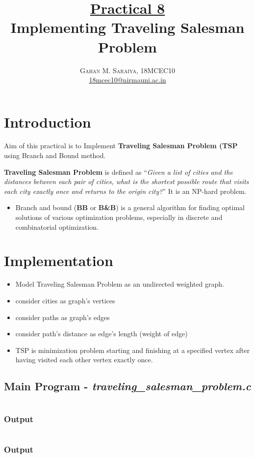 \documentclass[paper=letter, fontsize=12pt]{article}
\title{\vspace{-15mm}\fontsize{24pt}{10pt}\selectfont\textbf{
		\underline{Practical 8}\\Implementing Traveling Salesman Problem}} %
\author{\large{\textsc{
		Gahan M. Saraiya, 18MCEC10 }}\\[2mm]
\normalsize \href{mailto:18mcec10@nirmauni.ac.in}{18mcec10@nirmauni.ac.in}\\[2mm] %
}
\date{}
\begin{document}
\maketitle %
\thispagestyle{fancy} %

\section{Introduction}
\paragraph{}
Aim of this practical is to Implement \textbf{Traveling Salesman Problem (TSP} using Branch and Bound method.

\textbf{Traveling Salesman Problem} is defined as “\textit{Given a list of cities and the distances between each pair of cities, what is the shortest possible route that visits each city exactly once and returns to the origin city?}” It is an NP-hard problem.
\begin{itemize}
	\item Branch and bound (\textbf{BB} or \textbf{B\&B}) is a general algorithm for finding optimal solutions of various optimization problems, especially in discrete and combinatorial optimization.
\end{itemize}

\section{Implementation}
\begin{itemize}
	\item Model Traveling Salesman Problem as an undirected weighted graph.
	\item consider cities as graph's vertices
	\item consider paths as graph's edges
	\item consider path's distance as edge's length (weight of edge)
	\item TSP is minimization problem starting and finishing at a specified vertex after having visited each other vertex exactly once.
\end{itemize}

\subsection{Main Program - \textbf{\textit{traveling\_salesman\_problem.c}}}
\inputminted[frame=lines, breaklines, linenos]{c}{../traveling_salesman_problem.c}

\subsubsection{Output}
\inputminted[frame=lines, breaklines, linenos]{text}{../output.txt}

\subsubsection{Output}
\inputminted[frame=lines, breaklines, linenos]{text}{../output2.txt}
%
\end{document}
